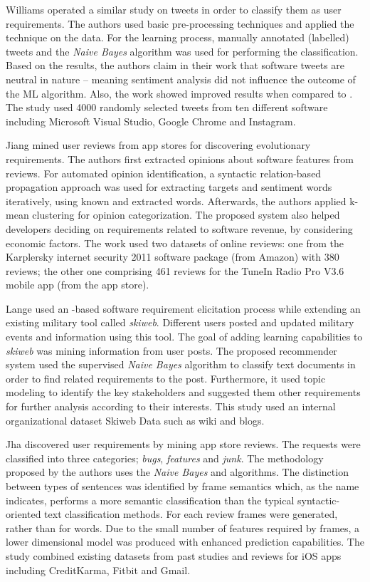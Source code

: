 Williams \etal \cite{Williams:2017} operated a similar study on tweets in order
to classify them as user requirements. The authors used basic pre-processing
techniques and applied the \VSM technique on the data. For the learning process,
manually annotated (labelled) tweets and the \emph{Naive Bayes} algorithm was used for
performing the classification. Based on the results, the authors claim in their
work that software tweets are neutral in nature -- meaning sentiment analysis
did not influence the outcome of the ML algorithm. Also, the work showed
improved results when compared to \cite{Guzman:2017}. The study used 4000
randomly selected tweets from ten different software including Microsoft Visual Studio, Google Chrome and Instagram.

Jiang \etal \cite{Jiang:2014} mined user reviews from app stores for discovering
evolutionary requirements. The authors first extracted opinions about software
features from reviews. For automated opinion identification, a syntactic
relation-based propagation approach was used for extracting targets and
sentiment words iteratively, using known and extracted words. Afterwards, the
authors applied k-mean clustering for opinion categorization. The proposed
system also helped developers deciding on requirements related to software
revenue, by considering economic factors. The work used two datasets of online
reviews: one from the Karplersky internet security 2011 software package (from Amazon) with 380
reviews; the other one comprising 461 reviews for the TuneIn Radio Pro V3.6
mobile app (from the app store).

Lange \etal\cite{Douglas:S2008} used an \ML-based software
requirement elicitation process while extending an existing military tool called
\emph{skiweb}.  Different users posted and updated military events and
information using this tool. The goal of adding learning capabilities to
\emph{skiweb} was mining information from user posts. The proposed recommender
system used the supervised \emph{Naive Bayes} algorithm to classify text
documents in order to find related requirements to the post. Furthermore, it used topic
modeling to identify the key stakeholders and suggested them other requirements
for further analysis according to their interests. This study used an internal
organizational dataset Skiweb Data such as wiki and blogs.

Jha \etal \cite{Jha:2017} discovered user requirements by mining app store
reviews. The requests were classified into three categories; \emph{bugs},
\emph{features} and \emph{junk}. The methodology proposed by the authors uses
the \emph{Naive Bayes} and \SVM algorithms. The distinction between types of
sentences was identified by frame semantics  which, as the name indicates, performs
a more semantic classification than the typical syntactic-oriented text
classification methods. For each review frames were generated, rather than for
words. Due to the small number of features required by frames, a lower
dimensional model was produced with enhanced prediction capabilities. The study combined existing
datasets from past studies and reviews for iOS apps including CreditKarma,
Fitbit and Gmail.

